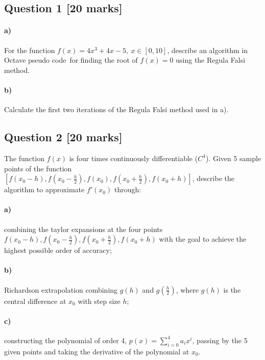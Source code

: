 \documentclass[11pt,a4paper,hidelinks,fleqn]{article}            %
\date{}
\begin{document}
\subsection*{Question 1 [20 marks]}

\paragraph{a)} For the function $f(x) = 4x^3 + 4 x - 5, ~x\in[0, 10]$,
describe an algorithm in Octave pseudo code\footnotemark ~for finding the root of $f(x) = 0$ using the Regula Falsi method.

\paragraph{b)} Calculate the first two iterations of the Regula Falsi method used in a).

\subsection*{Question 2 [20 marks]} 

The function $f(x)$ is four times continuously differentiable ($C^4$).
Given 5 sample points of the function $[f(x_0-h), f(x_0-\frac{h}{2}), f(x_0), f(x_0+\frac{h}{2}), f(x_0+h)]$,
describe the algorithm to approximate $f'(x_0)$ through:

\paragraph{a)} combining the taylor expansions at the four points $f(x_0-h), f(x_0-\frac{h}{2}), f(x_0+\frac{h}{2}), f(x_0+h)$
with the goal to achieve the highest possible order of accuracy;

\paragraph{b)} Richardson extrapolation combining $g(h)$ and $g(\frac h2)$, where $g(h)$ is the central difference at $x_0$ with step size $h$; 

\paragraph{c)} constructing the polynomial of order 4, $p(x) = \sum_{i=0}^4 a_i x^i$, passing by the 5 given points and taking the derivative of the polynomial at $x_0$.
\end{document}
